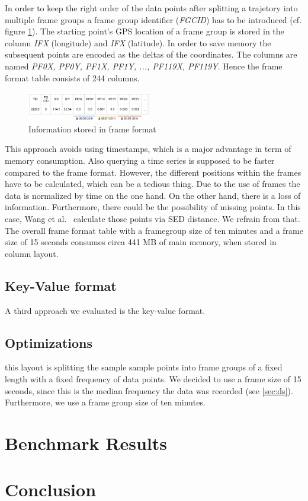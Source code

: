\documentclass[10pt]{sig-alternate}
\begin{document}
In order to keep the right order of the data points after splitting a trajetory into multiple frame groups a frame group identifier (\textit{FGCID}) has to be introduced (cf. figure \ref{fig:frame_format}). The starting point's GPS location of a frame group is stored in the column \textit{IFX} (longitude) and \textit{IFX} (latitude). In order to save memory the subsequent points are encoded as the deltas of the coordinates. The columns are named \textit{PF0X, PF0Y, PF1X, PF1Y, ..., PF119X, PF119Y}. Hence the frame format table consists of 244 columns.

\begin{figure}[ht]
\centering
\includegraphics[width=0.48\textwidth]{img/frame_format.png}
\caption{Information stored in frame format}
\label{fig:frame_format}
\end{figure}

This approach avoids using timestamps, which is a major advantage in term of memory consumption. Also querying a time series is supposed to be faster compared to the frame format. However, the different positions within the frames have to be calculated, which can be a tedious thing. Due to the use of frames the data is normalized by time on the one hand. On the other hand, there is a loss of information. Furthermore, there could be the possibility of missing points. In this case, Wang et al.~\cite{wang} calculate those points via SED distance. We refrain from that. The overall frame format table with a framegroup size of ten minutes and a frame size of 15 seconds consumes circa 441 MB of main memory, when stored in column layout.


\subsection{Key-Value format}

A third approach we evaluated is the key-value format.
\subsection{Optimizations}


this layout is splitting the sample sample points into frame groups of a fixed length with a fixed frequency of data points. We decided to use a frame size of 15 seconds, since this is the median frequency the data was recorded (see \ref{sec:ds}). Furthermore, we use a frame group size of ten minutes.


\section{Benchmark Results}

\section{Conclusion}
% 


\end{document}
